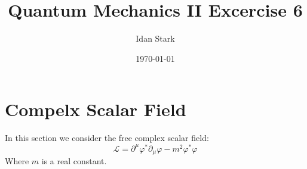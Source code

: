 \documentclass{article}
\title{Quantum Mechanics II Excercise 6}
\author{Idan Stark}
\date{\today}
\begin{document}
\maketitle

\section{}

\section{Compelx Scalar Field}
In this section we consider the free complex scalar field:
\begin{equation}
    \mathcal{L} = \partial^\mu\varphi^*\partial_\mu\varphi - m^2 \varphi^*\varphi
\end{equation}
Where $m$ is a real constant.
\end{document}
